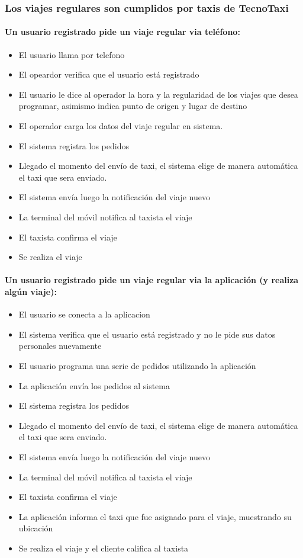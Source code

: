 \documentclass[a4paper]{artcle}
\begin{document}
\subsubsection{Los viajes regulares son cumplidos por taxis de TecnoTaxi}

\paragraph{Un usuario registrado pide un viaje regular via tel\'efono:}
\begin{itemize}
\item El usuario llama por telefono
\item El opeardor verifica que el usuario est\'a registrado
\item El usuario le dice al operador la hora y la regularidad de los viajes que desea programar, asimismo indica punto de origen y lugar de destino
\item El operador carga los datos del viaje regular en sistema.
\item El sistema registra los pedidos 
\item Llegado el momento del env\'io de taxi, el sistema elige de manera autom\'atica el taxi que sera enviado.
\item El sistema env\'ia luego la notificaci\'on del viaje nuevo
\item La terminal del m\'ovil notifica al taxista el viaje
\item El taxista confirma el viaje
\item Se realiza el viaje
\end{itemize}


\paragraph{Un usuario registrado pide un viaje regular via la aplicaci\'on (y realiza alg\'un viaje):}
\begin{itemize}
\item El usuario se conecta a la aplicacion
\item El sistema verifica que el usuario est\'a registrado y no le pide sus datos personales nuevamente
\item El usuario programa una serie de pedidos utilizando la aplicaci\'on
\item La aplicaci\'on env\'ia los pedidos al sistema
\item El sistema registra los pedidos 
\item Llegado el momento del env\'io de taxi, el sistema elige de manera autom\'atica el taxi que sera enviado.
\item El sistema env\'ia luego la notificaci\'on del viaje nuevo
\item La terminal del m\'ovil notifica al taxista el viaje
\item El taxista confirma el viaje
\item La aplicaci\'on informa el taxi que fue asignado para el viaje, muestrando su ubicaci\'on
\item Se realiza el viaje y el cliente califica al taxista
\end{itemize}
\end{document}
